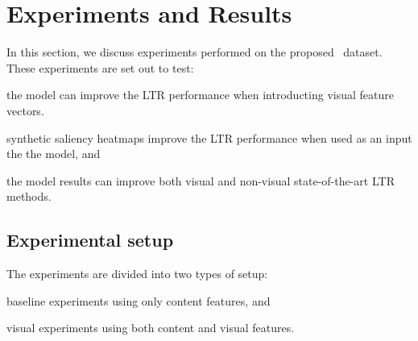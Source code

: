 
%



\section{Experiments and Results}
In this section, we discuss experiments performed on the proposed \datasetname~dataset.
These experiments are set out to test:
\begin{inparaenum}[(i)]
\item the \modelname model can improve the \ac{LTR} performance when introducting visual feature vectors. 
\item synthetic saliency heatmaps improve the \ac{LTR} performance when used as an input the the \modelname model, and
\item the \modelname model results can improve both visual and non-visual state-of-the-art \ac{LTR} methods.
\end{inparaenum}

\subsection{Experimental setup}
The experiments are divided into two types of setup:
\begin{inparaenum}[(i)]
\item baseline experiments using only content features, and
\item visual experiments using both content and visual features.
\end{inparaenum}

